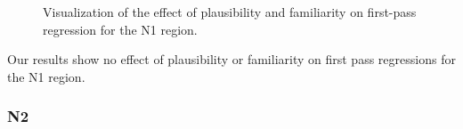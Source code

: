 \documentclass[
  letterpaper,
  DIV=11,
  numbers=noendperiod,
  nottoc]{scrreprt}
\begin{document}
\begin{figure}[htbp]


\caption{\label{fig-firstpassn1staub}Visualization of the effect of
plausibility and familiarity on first-pass regression for the N1
region.}

\end{figure}%

Our results show no effect of plausibility or familiarity on first pass
regressions for the N1 region.

\subsubsection{N2}\label{n2-7}
\end{document}
